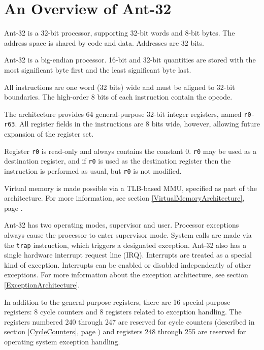 

\chapter{An Overview of Ant-32}

Ant-32 is a 32-bit processor, supporting 32-bit words and 8-bit bytes. 
The address space is shared by code and data.  Addresses are 32 bits.

Ant-32 is a big-endian processor.  16-bit and 32-bit quantities are
stored with the most significant byte first and the least significant
byte last.

All instructions are one word (32 bits) wide and must be aligned to
32-bit boundaries.  The high-order 8 bits of each instruction contain
the opcode.

The architecture provides 64 general-purpose 32-bit integer registers,
named {\tt r0-r63}.  All register fields in the instructions are 8
bits wide, however, allowing future expansion of the register set.

Register {\tt r0} is read-only and always contains the constant 0. 
{\tt r0} may be used as a destination register, and if {\tt r0} is
used as the destination register then the instruction is performed as
usual, but {\tt r0} is not modified.

Virtual memory is made possible via a TLB-based MMU, specified as part
of the architecture.  For more information, see section
\ref{VirtualMemoryArchitecture}, page
\pageref{VirtualMemoryArchitecture}.

Ant-32 has two operating modes, supervisor and user.  Processor
exceptions always cause the processor to enter supervisor mode. 
System calls are made via the {\tt trap} instruction, which triggers a
designated exception.  Ant-32 also has a single hardware interrupt
request line (IRQ).  Interrupts are treated as a special kind of
exception.  Interrupts can be enabled or disabled independently of
other exceptions.  For more information about the exception
architecture, see section \ref{ExceptionArchitecture}.

In addition to the general-purpose registers, there are 16
special-purpose registers:  8 cycle counters and 8 registers related
to exception handling.  The registers numbered 240 through
247 are reserved for cycle counters (described in section
\ref{CycleCounters}, page \pageref{CycleCounters}) and registers 248
through 255 are reserved for operating system exception handling.


